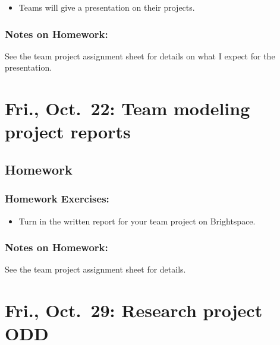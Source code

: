 \documentclass[
]{article}
\providecommand{\tightlist}{%
  \setlength{\itemsep}{0pt}\setlength{\parskip}{0pt}}
\begin{document}
\begin{itemize}
\tightlist
\item
  Teams will give a presentation on their projects.
\end{itemize}

\hypertarget{notes-on-homework-7}{%
\subsubsection{Notes on Homework:}\label{notes-on-homework-7}}

See the team project assignment sheet for details on what I expect for
the presentation.

\hypertarget{fri.-oct.-22-team-modeling-project-reports}{%
\section{Fri., Oct.~22: Team modeling project
reports}\label{fri.-oct.-22-team-modeling-project-reports}}

\hypertarget{homework-12}{%
\subsection{Homework}\label{homework-12}}

\hypertarget{homework-exercises-12}{%
\subsubsection{Homework Exercises:}\label{homework-exercises-12}}

\begin{itemize}
\tightlist
\item
  Turn in the written report for your team project on Brightspace.
\end{itemize}

\hypertarget{notes-on-homework-8}{%
\subsubsection{Notes on Homework:}\label{notes-on-homework-8}}

See the team project assignment sheet for details.

\hypertarget{fri.-oct.-29-research-project-odd}{%
\section{Fri., Oct.~29: Research project
ODD}\label{fri.-oct.-29-research-project-odd}}
\end{document}
